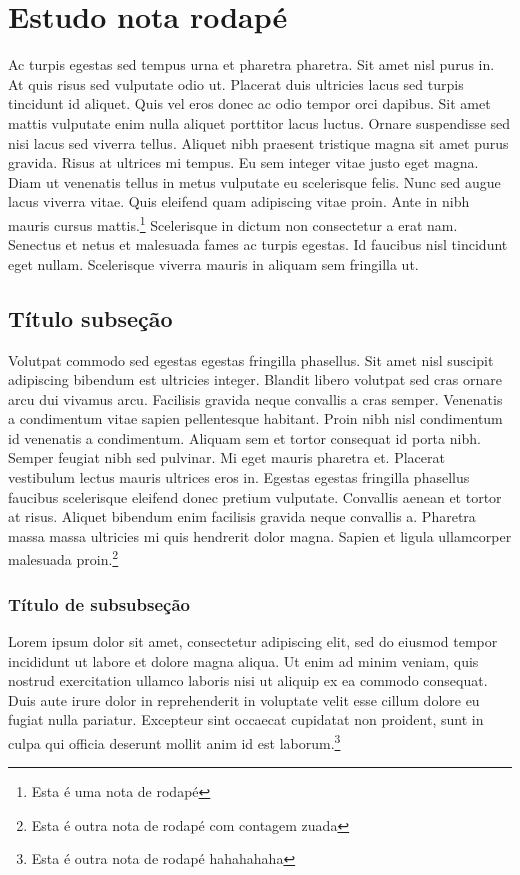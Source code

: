 \documentclass[12pt]{article}
\begin{document}
	\section{Estudo nota rodapé}
		Ac turpis egestas sed tempus urna et pharetra pharetra. Sit amet nisl purus in. At quis risus sed vulputate odio ut. Placerat duis ultricies lacus sed turpis tincidunt id aliquet. Quis vel eros donec ac odio tempor orci dapibus. Sit amet mattis vulputate enim nulla aliquet porttitor lacus luctus. Ornare suspendisse sed nisi lacus sed viverra tellus. Aliquet nibh praesent tristique magna sit amet purus gravida. Risus at ultrices mi tempus. Eu sem integer vitae justo eget magna. Diam ut venenatis tellus in metus vulputate eu scelerisque felis. Nunc sed augue lacus viverra vitae. Quis eleifend quam adipiscing vitae proin. Ante in nibh mauris cursus mattis.\footnote{Esta é uma nota de rodapé} Scelerisque in dictum non consectetur a erat nam. Senectus et netus et malesuada fames ac turpis egestas. Id faucibus nisl tincidunt eget nullam. Scelerisque viverra mauris in aliquam sem fringilla ut.
	
		\subsection{Título subseção}
			Volutpat commodo sed egestas egestas fringilla phasellus. Sit amet nisl suscipit adipiscing bibendum est ultricies integer. Blandit libero volutpat sed cras ornare arcu dui vivamus arcu. Facilisis gravida neque convallis a cras semper. Venenatis a condimentum vitae sapien pellentesque habitant. Proin nibh nisl condimentum id venenatis a condimentum. Aliquam sem et tortor consequat id porta nibh. Semper feugiat nibh sed pulvinar. Mi eget mauris pharetra et. Placerat vestibulum lectus mauris ultrices eros in. Egestas egestas fringilla phasellus faucibus scelerisque eleifend donec pretium vulputate. Convallis aenean et tortor at risus. Aliquet bibendum enim facilisis gravida neque convallis a. Pharetra massa massa ultricies mi quis hendrerit dolor magna. Sapien et ligula ullamcorper malesuada proin.\footnote[516]{Esta é outra nota de rodapé com contagem zuada}
		
			\subsubsection{Título de subsubseção}
				Lorem ipsum dolor sit amet, consectetur adipiscing elit, sed do eiusmod tempor incididunt ut labore et dolore magna aliqua. Ut enim ad minim veniam, quis nostrud exercitation ullamco laboris nisi ut aliquip ex ea commodo consequat. Duis aute irure dolor in reprehenderit in voluptate velit esse cillum dolore eu fugiat nulla pariatur. Excepteur sint occaecat cupidatat non proident, sunt in culpa qui officia deserunt mollit anim id est laborum.\footnote{Esta é outra nota de rodapé hahahahaha}
			
\end{document}
